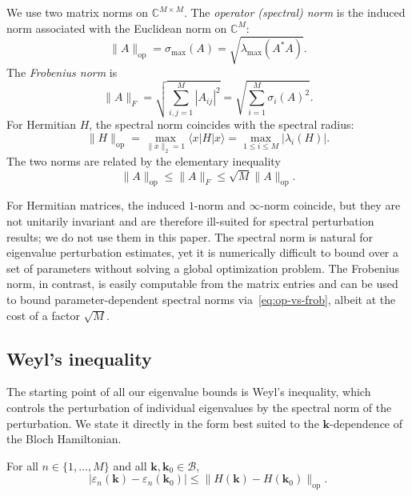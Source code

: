 \documentclass[11pt]{article}
\numberwithin{equation}{section}
\begin{document}
We use two matrix norms on \(\mathbb{C}^{M\times M}\). The \emph{operator (spectral) norm}
is the induced norm associated with the Euclidean norm on \(\mathbb{C}^M\):
\begin{equation}
    \|A\|_\mathrm{op} = \sigma_\mathrm{max}(A)
    = \sqrt{\lambda_\mathrm{max}(A^*A)}.
\end{equation}
The \emph{Frobenius norm} is
\begin{equation}
    \|A\|_F = \sqrt{\sum_{i,j=1}^M |A_{ij}|^2}
    = \sqrt{\sum_{i=1}^M \sigma_i(A)^2}.
\end{equation}
For Hermitian \(H\), the spectral norm coincides with the spectral radius:
\begin{equation}
    \|H\|_\mathrm{op} = \max_{\|x\|_2 = 1} \langle x | H | x \rangle
    = \max_{1 \leq i \leq M} |\lambda_i(H)|.
\end{equation}
The two norms are related by the elementary inequality
\begin{equation}
    \|A\|_\mathrm{op} \leq \|A\|_F \leq \sqrt{M}\|A\|_\mathrm{op}.
    \label{eq:op-vs-frob}
\end{equation}

\begin{remark}
    For Hermitian matrices, the induced \(1\)-norm and \(\infty\)-norm coincide, but they
    are not unitarily invariant and are therefore ill-suited for spectral perturbation
    results; we do not use them in this paper. The spectral norm is natural for eigenvalue
    perturbation estimates, yet it is numerically difficult to bound over a set of
    parameters without solving a global optimization problem. The Frobenius norm, in
    contrast, is easily computable from the matrix entries and can be used to bound
    parameter-dependent spectral norms via~\eqref{eq:op-vs-frob}, albeit at the cost of a
    factor \(\sqrt{M}\).
\end{remark}


\subsection{Weyl's inequality}\label{sec:weyl}

The starting point of all our eigenvalue bounds is Weyl's inequality, which controls the
perturbation of individual eigenvalues by the spectral norm of the perturbation. We state
it directly in the form best suited to the \(\mathbf{k}\)-dependence of the Bloch
Hamiltonian.

\begin{lemma}
    \label{lemma:weyl} %
    For all \(n \in \{1,\dots,M\}\) and all \(\mathbf{k}, \mathbf{k}_0 \in \mathcal{B}\),
    \begin{equation}
        |\varepsilon_n(\mathbf{k}) - \varepsilon_n(\mathbf{k}_0)|
        \leq \|H(\mathbf{k}) - H(\mathbf{k}_0)\|_\mathrm{op}.
    \end{equation}
\end{lemma}
\end{document}
